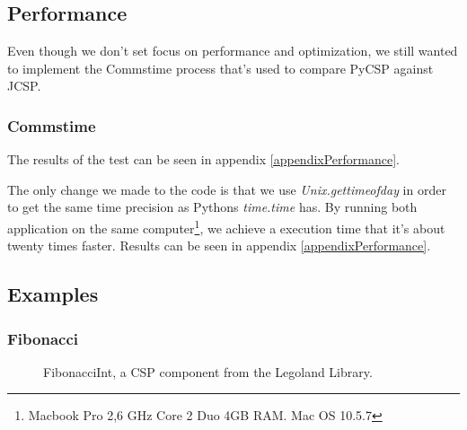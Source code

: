 \documentclass[a4paper,12pt]{article}
\begin{document}
\subsection{Performance}
\label{performance}
Even though we don't set focus on performance and optimization, we still wanted
to implement the Commstime\cite{vinterpycsp} process that's used to compare
PyCSP against JCSP.

\subsubsection{Commstime}
The results of the test can be seen in appendix \ref{appendixPerformance}.

The only change we made to the code is that we use {\it Unix.gettimeofday} in
order to get the same time precision as Pythons {\it time.time} has. By running
both application on the same computer\footnote{Macbook Pro 2,6 GHz Core 2 Duo
4GB RAM. Mac OS 10.5.7}, we achieve a execution time that it's about twenty
times faster. Results can be seen in appendix \ref{appendixPerformance}.

\subsection{Examples}
\label{examples}

\subsubsection{Fibonacci}
\begin{figure}[h]
  \begin{center}
  \end{center}
  \caption{FibonacciInt, a CSP component from the Legoland Library.}
  \label{fibonaccicomp}
\end{figure}
\end{document}
